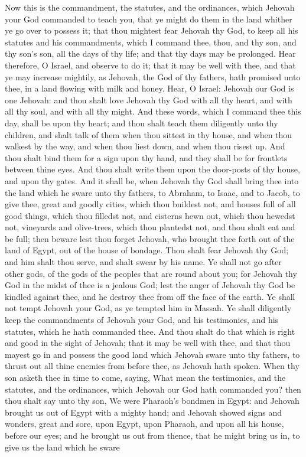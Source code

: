 Now this is the commandment, the statutes, and the ordinances, which Jehovah your God commanded to teach you, that ye might do them in the land whither ye go over to possess it; that thou mightest fear Jehovah thy God, to keep all his statutes and his commandments, which I command thee, thou, and thy son, and thy son’s son, all the days of thy life; and that thy days may be prolonged. Hear therefore, O Israel, and observe to do it; that it may be well with thee, and that ye may increase mightily, as Jehovah, the God of thy fathers, hath promised unto thee, in a land flowing with milk and honey.  Hear, O Israel: Jehovah our God is one Jehovah: and thou shalt love Jehovah thy God with all thy heart, and with all thy soul, and with all thy might. And these words, which I command thee this day, shall be upon thy heart; and thou shalt teach them diligently unto thy children, and shalt talk of them when thou sittest in thy house, and when thou walkest by the way, and when thou liest down, and when thou risest up. And thou shalt bind them for a sign upon thy hand, and they shall be for frontlets between thine eyes. And thou shalt write them upon the door-posts of thy house, and upon thy gates.  And it shall be, when Jehovah thy God shall bring thee into the land which he sware unto thy fathers, to Abraham, to Isaac, and to Jacob, to give thee, great and goodly cities, which thou buildest not, and houses full of all good things, which thou filledst not, and cisterns hewn out, which thou hewedst not, vineyards and olive-trees, which thou plantedst not, and thou shalt eat and be full; then beware lest thou forget Jehovah, who brought thee forth out of the land of Egypt, out of the house of bondage. Thou shalt fear Jehovah thy God; and him shalt thou serve, and shalt swear by his name. Ye shall not go after other gods, of the gods of the peoples that are round about you; for Jehovah thy God in the midst of thee is a jealous God; lest the anger of Jehovah thy God be kindled against thee, and he destroy thee from off the face of the earth.  Ye shall not tempt Jehovah your God, as ye tempted him in Massah. Ye shall diligently keep the commandments of Jehovah your God, and his testimonies, and his statutes, which he hath commanded thee. And thou shalt do that which is right and good in the sight of Jehovah; that it may be well with thee, and that thou mayest go in and possess the good land which Jehovah sware unto thy fathers, to thrust out all thine enemies from before thee, as Jehovah hath spoken.  When thy son asketh thee in time to come, saying, What mean the testimonies, and the statutes, and the ordinances, which Jehovah our God hath commanded you? then thou shalt say unto thy son, We were Pharaoh’s bondmen in Egypt: and Jehovah brought us out of Egypt with a mighty hand; and Jehovah showed signs and wonders, great and sore, upon Egypt, upon Pharaoh, and upon all his house, before our eyes; and he brought us out from thence, that he might bring us in, to give us the land which he sware 
